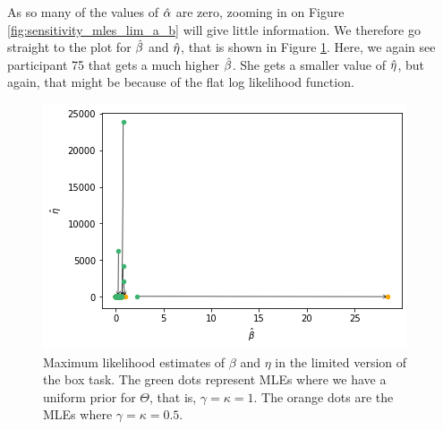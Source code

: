 As so many of the values of $\hat{\alpha}$ are zero, zooming in on Figure \ref{fig:sensitivity_mles_lim_a_b} will give little information. We therefore go straight to the plot for $\hat{\beta}$ and $\hat{\eta}$, that is shown in Figure \ref{fig:sensitivity_mles_lim_b_e}. Here, we again see participant 75 that gets a much higher $\hat{\beta}$. She gets a smaller value of $\hat{\eta}$, but again, that might be because of the flat log likelihood function. 
\begin{figure}
    \centering
    \includegraphics[scale=0.8]{pictures/Sensitivity/mles_lim_b_e.png}
    \caption[MLEs of $\beta$ and $\eta$ for prior with $\gamma=\kappa=1$ and $\gamma=\kappa=0.5$, limited]{
    Maximum likelihood estimates of $\beta$ and $\eta$ in the limited version of the box task. The green dots represent MLEs where we have a uniform prior for $\Theta$, that is, $\gamma=\kappa=1$. The orange dots are the MLEs where $\gamma=\kappa=0.5$.}
    \label{fig:sensitivity_mles_lim_b_e}
\end{figure}

